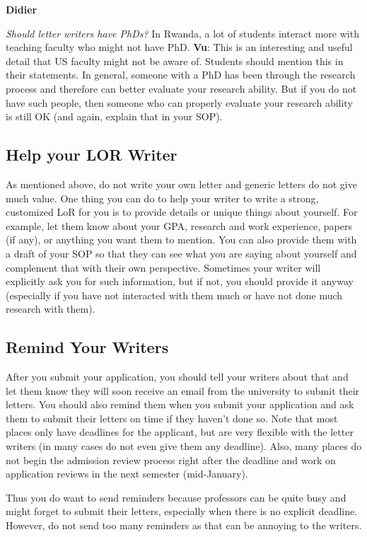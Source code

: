 \documentclass[oneside,11pt,dvipsnames]{book}
\newenvironment{commentbox}[1][]{
  \small
  \begin{mybox}
    {\small \textbf{#1}}
  }{
  \end{mybox}
}
\begin{document}
\begin{commentbox}[Didier]
  \emph{Should letter writers have PhDs?}  In Rwanda, a lot of students interact more with teaching faculty who might not have PhD.
  \tcblower
  \textbf{Vu}: This is an interesting and useful detail that US faculty might not be aware of. Students should mention this in their statements. In general, someone with a PhD has been through the research process and therefore can better evaluate your research ability.  But if you do not have such people, then someone who can properly evaluate your research ability is still OK (and again, explain that in your SOP).
\end{commentbox}


\subsection{Help your LOR Writer} As mentioned above, do not write your own letter and generic letters do not give much value. One thing you can do to help your writer to write a strong, customized LoR for you is to provide details or unique things about yourself. For example, let them know about your GPA, research and work experience, papers (if any), or anything you want them to mention. You can also provide them with a draft of your SOP so that they can see what you are saying about yourself and complement that with their own perspective.
Sometimes your writer will explicitly ask you for such information, but if not, you should provide it anyway (especially if you have not interacted with them much or have not done much research with them).


\subsection{Remind Your Writers} After you submit your application, you should tell your writers about that and let them know they will soon receive an email from the university to submit their letters.  You should also remind them when you submit your application and ask them to submit their letters on time if they haven't done so.  Note that most places only have deadlines for the applicant, but are very flexible with the letter writers (in many cases do not even give them any deadline).  Also, many places do not begin the admission review process right after the deadline and work on application reviews in the next semester (mid-January).  

Thus you do want to send reminders because professors can be quite busy and might forget to submit their letters, especially when there is no explicit deadline. However, do not send too many reminders as that can be annoying to the writers.
\end{document}

